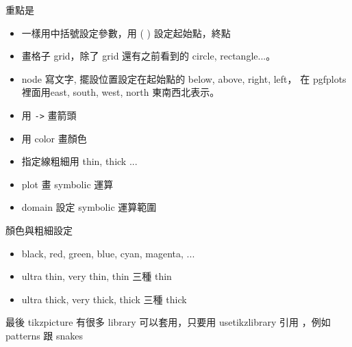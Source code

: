 \begin{center}
\end{center}
重點是
\begin{itemize}
  \item 一樣用中括號設定參數，用 ( ) 設定起始點，終點
  \item 畫格子 grid，除了 grid 還有之前看到的 circle, rectangle...。
  \item node 寫文字, 擺設位置設定在起始點的 below, above, right, left，
    在 pgfplots 裡面用east, south, west, north 東南西北表示。
  \item 用 \verb=->= 畫箭頭
  \item 用 color 畫顏色
  \item 指定線粗細用 thin, thick ...
  \item plot 畫 symbolic 運算
  \item domain 設定 symbolic 運算範圍
\end{itemize}
顏色與粗細設定
\begin{itemize}
  \item black, red, green, blue, cyan, magenta, ...
  \item ultra thin, very thin, thin 三種 thin
  \item ultra thick, very thick, thick 三種 thick
\end{itemize}
\begin{center}
\end{center}
最後 tikzpicture 有很多 library 可以套用，只要用 usetikzlibrary 引用
，例如 patterns 跟 snakes
